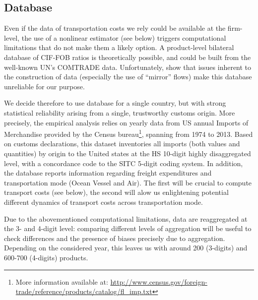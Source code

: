 \documentclass[a4paper,11pt]{article}
\begin{document}
\subsection{Database}



\noindent Even if the data of transportation costs we rely could be available at the firm-level, the use of a nonlinear estimator (see below) triggers computational limitations that do not make them a likely option. A product-level bilateral database of CIF-FOB ratios is theoretically possible, and could be built from the well-known UN's COMTRADE data. Unfortunately, \citet{hummels_rie} show that issues inherent to the construction of data (especially the use of ``mirror'' flows) make this database unreliable for our purpose.

We decide therefore to use database for a single country, but with strong statistical reliability arising from a single, trustworthy customs origin. More precisely, the empirical analysis relies on yearly data from US annual Imports of Merchandise provided by the Census bureau\footnote{More information available at: \url{http://www.census.gov/foreign-trade/reference/products/catalog/fl_imp.txt}}, spanning from 1974 to 2013. Based on customs declarations, this dataset inventories all imports (both values and quantities) by origin to the United states at the HS 10-digit highly disaggregated level, with a concordance code to the SITC 5-digit coding system. In addition, the database reports information regarding freight expenditures and transportation mode (Ocean Vessel and Air). The first will be crucial to compute transport costs (see below), the second will alow us enlightening potential different dynamics of transport costs across transportation mode.

Due to the abovementioned computational limitations, data are reaggregated at the 3- and 4-digit level: comparing different levels of aggregation will be useful to check differences and the presence of biases precisely due to aggregation. Depending on the considered year, this leaves us with around 200 (3-digits) and 600-700 (4-digits) products.


\end{document}

